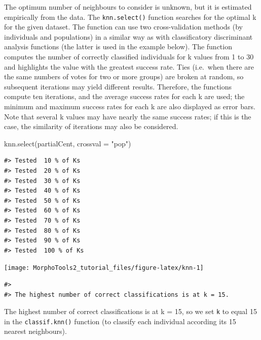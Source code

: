 \documentclass[
  11pt,
  a4paper]{article}
\newenvironment{Shaded}{\begin{snugshade}}{\end{snugshade}}
\newcommand{\AttributeTok}[1]{\textcolor[rgb]{0.77,0.63,0.00}{#1}}
\newcommand{\FunctionTok}[1]{\textcolor[rgb]{0.00,0.00,0.00}{#1}}
\newcommand{\NormalTok}[1]{#1}
\newcommand{\StringTok}[1]{\textcolor[rgb]{0.31,0.60,0.02}{#1}}
\begin{document}
The optimum number of neighbours to consider is unknown, but it is
estimated empirically from the data. The \texttt{knn.select()} function
searches for the optimal k for the given dataset. The function can use
two cross-validation methods (by individuals and populations) in a
similar way as with classificatory discriminant analysis functions (the
latter is used in the example below). The function computes the number
of correctly classified individuals for k values from 1 to 30 and
highlights the value with the greatest success rate. Ties (i.e.~when
there are the same numbers of votes for two or more groups) are broken
at random, so subsequent iterations may yield different results.
Therefore, the functions compute ten iterations, and the average success
rates for each k are used; the minimum and maximum success rates for
each k are also displayed as error bars. Note that several k values may
have nearly the same success rates; if this is the case, the similarity
of iterations may also be considered.

\begin{Shaded}
\begin{Highlighting}[]
\FunctionTok{knn.select}\NormalTok{(partialCent, }\AttributeTok{crossval =} \StringTok{"pop"}\NormalTok{)}
\end{Highlighting}
\end{Shaded}

\begin{verbatim}
#> Tested  10 % of Ks 
#> Tested  20 % of Ks 
#> Tested  30 % of Ks 
#> Tested  40 % of Ks 
#> Tested  50 % of Ks 
#> Tested  60 % of Ks 
#> Tested  70 % of Ks 
#> Tested  80 % of Ks 
#> Tested  90 % of Ks 
#> Tested  100 % of Ks
\end{verbatim}

\begin{center}\texttt{[image: MorphoTools2\_tutorial\_files/figure-latex/knn-1]} \end{center}

\begin{verbatim}
#> 
#> The highest number of correct classifications is at k = 15.
\end{verbatim}

The highest number of correct classifications is at k = 15, so we set
\texttt{k} to equal 15 in the \texttt{classif.knn()} function (to
classify each individual according its 15 nearest neighbours).
\end{document}
